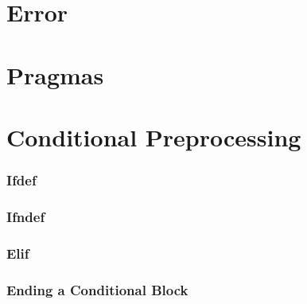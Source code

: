 \section{Error}

\section{Pragmas}

\section{Conditional Preprocessing}

\subsubsection{Ifdef}
\subsubsection{Ifndef}
\subsubsection{Elif}

\subsubsection{Ending a Conditional Block}


